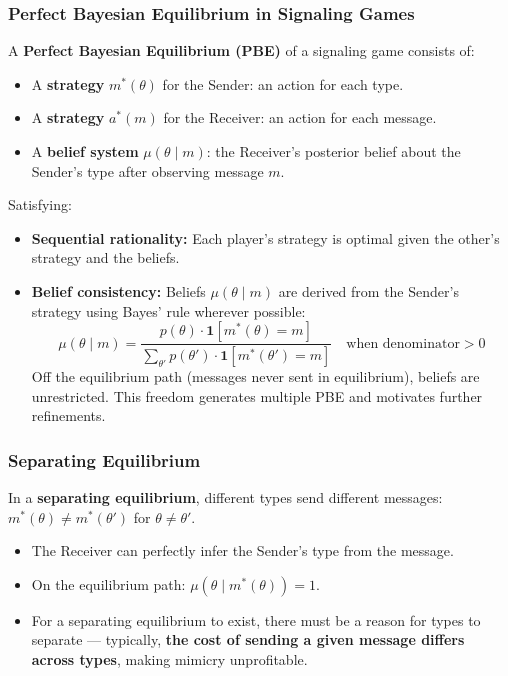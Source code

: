 \documentclass[hidelinks]{article}
\begin{document}
\subsubsection{Perfect Bayesian Equilibrium in Signaling Games}

A \textbf{Perfect Bayesian Equilibrium (PBE)} of a signaling game consists of:
\begin{itemize}
    \item A \textbf{strategy} $m^*(\theta)$ for the Sender: an action for each type.
    \item A \textbf{strategy} $a^*(m)$ for the Receiver: an action for each message.
    \item A \textbf{belief system} $\mu(\theta \mid m)$: the Receiver's posterior belief about the Sender's type after observing message $m$.
\end{itemize}

Satisfying:
\begin{itemize}
    \item \textbf{Sequential rationality:} Each player's strategy is optimal given the other's strategy and the beliefs.
    \item \textbf{Belief consistency:} Beliefs $\mu(\theta \mid m)$ are derived from the Sender's strategy using Bayes' rule wherever possible:
    \[
    \mu(\theta \mid m) = \frac{p(\theta) \cdot \mathbf{1}[m^*(\theta) = m]}{\sum_{\theta'} p(\theta') \cdot \mathbf{1}[m^*(\theta') = m]} \quad \text{when denominator} > 0
    \]
    Off the equilibrium path (messages never sent in equilibrium), beliefs are unrestricted. This freedom generates multiple PBE and motivates further refinements.
\end{itemize}

\subsubsection{Separating Equilibrium}

In a \textbf{separating equilibrium}, different types send different messages: $m^*(\theta) \neq m^*(\theta')$ for $\theta \neq \theta'$.

\begin{itemize}
    \item The Receiver can perfectly infer the Sender's type from the message.
    \item On the equilibrium path: $\mu(\theta \mid m^*(\theta)) = 1$.
    \item For a separating equilibrium to exist, there must be a reason for types to separate — typically, \textbf{the cost of sending a given message differs across types}, making mimicry unprofitable.
\end{itemize}
\end{document}
